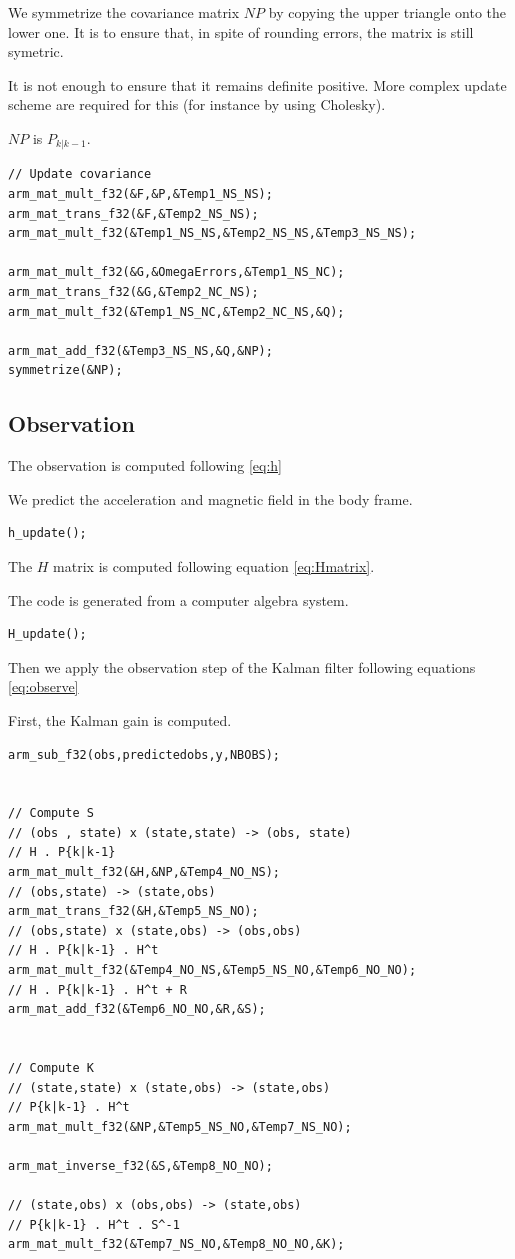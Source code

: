 \documentclass[titlepage,a4,12pt]{article}
\numberwithin{equation}{subsection}
\newcommand{\before}[1]{#1_{k|k-1}}
\begin{document}
We symmetrize the covariance matrix $NP$ by copying the upper triangle onto the lower one. It is to ensure that, in spite of rounding errors, the matrix is still symetric.

It is not enough to ensure that it remains definite positive. More complex update scheme are required for this (for instance by using Cholesky).

$NP$ is $\before{P}$.

\begin{verbatim}
// Update covariance
arm_mat_mult_f32(&F,&P,&Temp1_NS_NS);
arm_mat_trans_f32(&F,&Temp2_NS_NS);
arm_mat_mult_f32(&Temp1_NS_NS,&Temp2_NS_NS,&Temp3_NS_NS);
  
arm_mat_mult_f32(&G,&OmegaErrors,&Temp1_NS_NC);
arm_mat_trans_f32(&G,&Temp2_NC_NS);
arm_mat_mult_f32(&Temp1_NS_NC,&Temp2_NC_NS,&Q);
  
arm_mat_add_f32(&Temp3_NS_NS,&Q,&NP);
symmetrize(&NP);

\end{verbatim}

\subsection{Observation}

The observation is computed following \ref{eq:h}

We predict the acceleration and magnetic field in the body frame.

\begin{verbatim}
h_update();
\end{verbatim}

The $H$ matrix is computed following equation \ref{eq:Hmatrix}.

The code is generated from a computer algebra system.

\begin{verbatim}
H_update();
\end{verbatim}

Then we apply the observation step of the Kalman filter following equations \ref{eq:observe}

First, the Kalman gain is computed.

\begin{verbatim}
arm_sub_f32(obs,predictedobs,y,NBOBS);


// Compute S
// (obs , state) x (state,state) -> (obs, state) 
// H . P{k|k-1}
arm_mat_mult_f32(&H,&NP,&Temp4_NO_NS);
// (obs,state) -> (state,obs)
arm_mat_trans_f32(&H,&Temp5_NS_NO);
// (obs,state) x (state,obs) -> (obs,obs)
// H . P{k|k-1} . H^t
arm_mat_mult_f32(&Temp4_NO_NS,&Temp5_NS_NO,&Temp6_NO_NO);
// H . P{k|k-1} . H^t + R
arm_mat_add_f32(&Temp6_NO_NO,&R,&S);
   

// Compute K 
// (state,state) x (state,obs) -> (state,obs)
// P{k|k-1} . H^t
arm_mat_mult_f32(&NP,&Temp5_NS_NO,&Temp7_NS_NO);

arm_mat_inverse_f32(&S,&Temp8_NO_NO);

// (state,obs) x (obs,obs) -> (state,obs)
// P{k|k-1} . H^t . S^-1
arm_mat_mult_f32(&Temp7_NS_NO,&Temp8_NO_NO,&K);
\end{verbatim}
\end{document}
